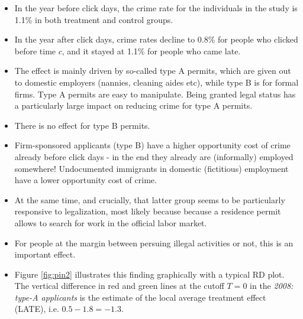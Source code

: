\documentclass[]{book}
\providecommand{\tightlist}{%
  \setlength{\itemsep}{0pt}\setlength{\parskip}{0pt}}
\begin{document}
\begin{itemize}
\tightlist
\item
  In the year before click days, the crime rate for the individuals in
  the study is 1.1\% in both treatment and control groups.
\item
  In the year after click days, crime rates decline to 0.8\% for people
  who clicked before time \(c\), and it stayed at 1.1\% for people who
  came late.
\item
  The effect is mainly driven by so-called type A permits, which are
  given out to domestic employers (nannies, cleaning aides etc), while
  type B is for formal firms. Type A permits are easy to manipulate.
  Being granted legal status has a particularly large impact on reducing
  crime for type A permits.
\item
  There is no effect for type B permits.
\item
  Firm-sponsored applicants (type B) have a higher opportunity cost of
  crime already before click days - in the end they already are
  (informally) employed somewhere! Undocumented immigrants in domestic
  (fictitious) employment have a lower opportunity cost of crime.
\item
  At the same time, and crucially, that latter group seems to be
  particularly responsive to legalization, most likely because because a
  residence permit allows to search for work in the official labor
  market.
\item
  For people at the margin between persuing illegal activities or not,
  this is an important effect.
\item
  Figure \ref{fig:pin2} illustrates this finding graphically with a
  typical RD plot. The vertical difference in red and green lines at the
  cutoff \(T=0\) in the \emph{2008: type-A applicants} is the estimate
  of the local average treatment effect (LATE), i.e.
  \(0.5 - 1.8 = -1.3\).
\end{itemize}
\end{document}
